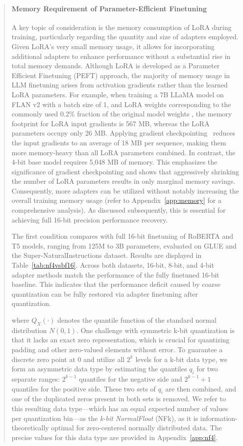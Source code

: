 \begin{quote}
\paragraph{Memory Requirement of Parameter-Efficient Finetuning} A key topic of consideration is the memory consumption of LoRA during training, particularly regarding the quantity and size of adapters employed. Given LoRA's very small memory usage, it allows for incorporating additional adapters to enhance performance without a substantial rise in total memory demands. Although LoRA is developed as a Parameter Efficient Finetuning (PEFT) approach, the majority of memory usage in LLM finetuning arises from activation gradients rather than the learned LoRA parameters. For example, when training a 7B LLaMA model on FLAN v2 with a batch size of 1, and LoRA weights corresponding to the commonly used 0.2\% fraction of the original model weights \citep{hu2021lora,liu2022few}, the memory footprint for LoRA input gradients is 567 MB, whereas the LoRA parameters occupy only 26 MB. Applying gradient checkpointing~\citep{chen2016training} reduces the input gradients to an average of 18 MB per sequence, making them more memory-heavy than all LoRA parameters combined. In contrast, the 4-bit base model requires 5,048 MB of memory. This emphasizes the significance of gradient checkpointing and shows that aggressively shrinking the number of LoRA parameters results in only marginal memory savings. Consequently, more adapters can be utilized without notably increasing the overall training memory usage (refer to Appendix~\ref{app:memory} for a comprehensive analysis). As discussed subsequently, this is essential for achieving full 16-bit precision performance recovery.

The first condition compares with full 16-bit finetuning of RoBERTA and T5 models, ranging from 125M to 3B parameters, evaluated on GLUE and the Super-NaturalInstructions dataset. Results are displayed in Table~\ref{tab:nf4vsbf16}. Across both datasets, 16-bit, 8-bit, and 4-bit adapter methods match the performance of the fully finetuned 16-bit baseline. This indicates that the performance deficit caused by coarse quantization can be fully restored via adapter finetuning after quantization.

where $Q_X(\cdot)$ denotes the quantile function of the standard normal distribution $N(0,1)$. One challenge with symmetric k-bit quantization is that it lacks an exact zero representation, which is crucial for quantizing padding and other zero-valued elements without error. To guarantee a discrete zero point at $0$ and utilize all $2^k$ levels for a k-bit data type, we form an asymmetric data type by estimating the quantiles $q_i$ for two separate ranges: $2^{k-1}$ quantiles for the negative side and $2^{k-1}+1$ quantiles for the positive side. These two sets of $q_i$ are then combined, and one of the duplicated zeros present in both sets is removed. We refer to this resulting data type—which has an equal expected number of values per quantization bin—as the \emph{k-bit NormalFloat} (NFk), as it is information-theoretically optimal for zero-centered normally distributed data. The precise values for this data type are provided in Appendix~\ref{app:nf4}.


\end{quote}
